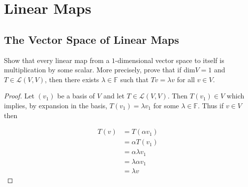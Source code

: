 \chapter{Linear Maps}

\section{\label{3.A} The Vector Space of Linear Maps}

\begin{exercise} \label{3.A.1}

\end{exercise}

\begin{exercise} \label{3.A.2}

\end{exercise}

\begin{exercise} \label{3.A.3}

\end{exercise}

\begin{exercise} \label{3.A.4}

\end{exercise}

\begin{exercise} \label{3.A.5}

\end{exercise}

\begin{exercise} \label{3.A.6}

\end{exercise}

\begin{exercise} \label{3.A.7}
    Show that every linear map from a \(1\)-dimensional vector space to itself is multiplication by some scalar. More precisely, prove that if dim\(V = 1\) and \( T \in \mathcal{L}(V,V) \), then there exists \( \lambda \in \mathbb{F} \) such that \( Tv = \lambda v \) for all \( v \in V \).
    
    \begin{proof}
        Let \( (v_1) \) be a basis of \( V \) and let \( T \in \mathcal{L}(V,V) \). Then \( T(v_1) \in V \) which implies, by expansion in the basis, \( T(v_1) = \lambda v_1 \) for some \( \lambda \in \mathbb{F} \). Thus if \( v \in V \) then
        
        \begin{align*}
            T(v) &= T(\alpha v_1) \\
            &= \alpha T(v_1) \\
            &= \alpha \lambda v_1 \\
            &= \lambda \alpha v_1 \\
            &= \lambda v
        \end{align*}
    \end{proof}
\end{exercise}

